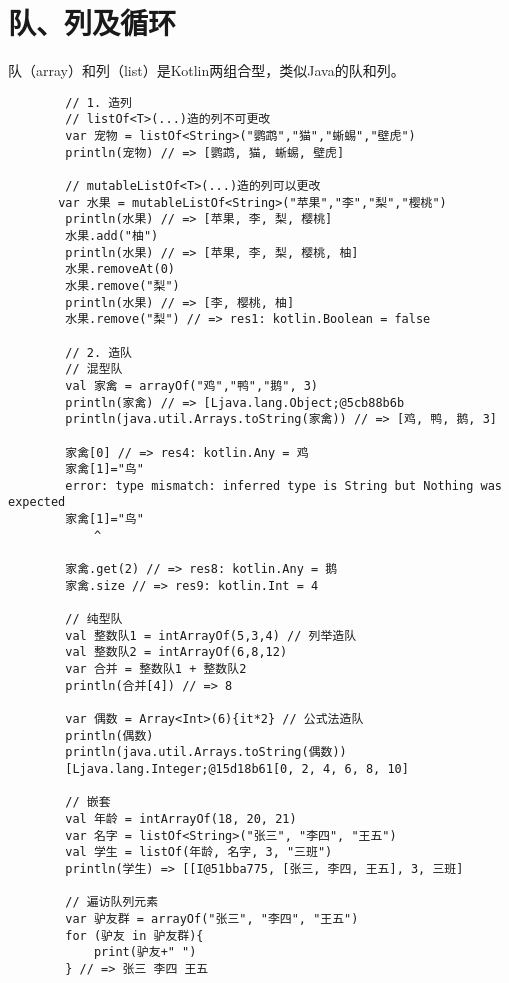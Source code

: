 \section{队、列及循环}
队（array）和列（list）是Kotlin两组合型，类似Java的队和列。
    \begin{verbatim}
        // 1. 造列
        // listOf<T>(...)造的列不可更改
        var 宠物 = listOf<String>("鹦鹉","猫","蜥蜴","壁虎")
        println(宠物) // => [鹦鹉, 猫, 蜥蜴, 壁虎] 
        
        // mutableListOf<T>(...)造的列可以更改
       var 水果 = mutableListOf<String>("苹果","李","梨","樱桃")
        println(水果) // => [苹果, 李, 梨, 樱桃]
        水果.add("柚")
        println(水果) // => [苹果, 李, 梨, 樱桃, 柚]
        水果.removeAt(0)
        水果.remove("梨")
        println(水果) // => [李, 樱桃, 柚]
        水果.remove("梨") // => res1: kotlin.Boolean = false 

        // 2. 造队
        // 混型队
        val 家禽 = arrayOf("鸡","鸭","鹅", 3)
        println(家禽) // => [Ljava.lang.Object;@5cb88b6b        
        println(java.util.Arrays.toString(家禽)) // => [鸡, 鸭, 鹅, 3] 

        家禽[0] // => res4: kotlin.Any = 鸡        
        家禽[1]="鸟"
        error: type mismatch: inferred type is String but Nothing was expected
        家禽[1]="鸟"
            ^

        家禽.get(2) // => res8: kotlin.Any = 鹅        
        家禽.size // => res9: kotlin.Int = 4

        // 纯型队
        val 整数队1 = intArrayOf(5,3,4) // 列举造队
        val 整数队2 = intArrayOf(6,8,12)
        var 合并 = 整数队1 + 整数队2
        println(合并[4]) // => 8

        var 偶数 = Array<Int>(6){it*2} // 公式法造队
        println(偶数)
        println(java.util.Arrays.toString(偶数))
        [Ljava.lang.Integer;@15d18b61[0, 2, 4, 6, 8, 10]

        // 嵌套
        val 年龄 = intArrayOf(18, 20, 21)
        var 名字 = listOf<String>("张三", "李四", "王五")
        val 学生 = listOf(年龄, 名字, 3, "三班")
        println(学生) => [[I@51bba775, [张三, 李四, 王五], 3, 三班]

        // 遍访队列元素
        var 驴友群 = arrayOf("张三", "李四", "王五")
        for (驴友 in 驴友群){
            print(驴友+" ")
        } // => 张三 李四 王五         


\end{verbatim}
